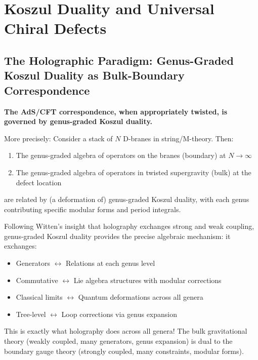 \section{Koszul Duality and Universal Chiral Defects}\label{sec:koszul-defects}

\subsection{The Holographic Paradigm: Genus-Graded Koszul Duality as Bulk-Boundary Correspondence}

\begin{principle}\label{principle:costello-li}
\textbf{The AdS/CFT correspondence, when appropriately twisted, is governed by genus-graded Koszul duality.}

More precisely: Consider a stack of $N$ D-branes in string/M-theory. Then:
\begin{enumerate}
\item The genus-graded algebra of operators on the branes (boundary) at $N \to \infty$
\item The genus-graded algebra of operators in twisted supergravity (bulk) at the defect location
\end{enumerate}
are related by (a deformation of) genus-graded Koszul duality, with each genus contributing specific modular forms and period integrals.
\end{principle}

\begin{remark}
Following Witten's insight that holography exchanges strong and weak coupling, genus-graded Koszul duality provides the precise algebraic mechanism: it exchanges:
\begin{itemize}
\item Generators $\leftrightarrow$ Relations at each genus level
\item Commutative $\leftrightarrow$ Lie algebra structures with modular corrections
\item Classical limits $\leftrightarrow$ Quantum deformations across all genera
\item Tree-level $\leftrightarrow$ Loop corrections via genus expansion
\end{itemize}
This is exactly what holography does across all genera! The bulk gravitational theory (weakly coupled, many generators, genus expansion) is dual to the boundary gauge theory (strongly coupled, many constraints, modular forms).
\end{remark}

